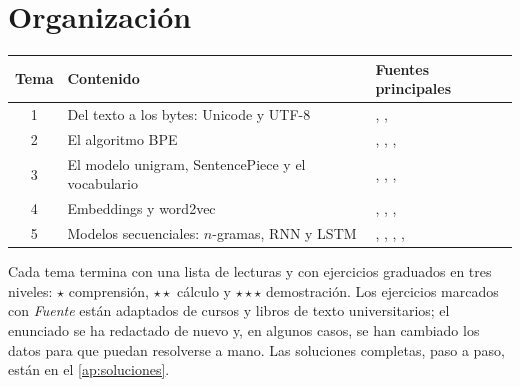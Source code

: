 \documentclass[11pt,a4paper,twoside,openany]{book}
\begin{document}
\section*{Organización}
\begin{center}\small
\begin{tabular}{@{}cll@{}}
\toprule
Tema & Contenido & Fuentes principales \\
\midrule
1 & Del texto a los bytes: Unicode y UTF-8 & \cite{jm3}, \cite{rfc3629}, \cite{cs336} \\
2 & El algoritmo BPE & \cite{sennrich}, \cite{jm3}, \cite{cs336}, \cite{gpt2} \\
3 & El modelo unigram, SentencePiece y el vocabulario & \cite{kudo}, \cite{sentencepiece}, \cite{jm3}, \cite{petrov} \\
4 & Embeddings y word2vec & \cite{jm3}, \cite{cs224n}, \cite{mikolov13b}, \cite{levy} \\
5 & Modelos secuenciales: $n$-gramas, RNN y LSTM & \cite{jm3}, \cite{cs224n}, \cite{bengio94}, \cite{pascanu}, \cite{lstm} \\
\bottomrule
\end{tabular}
\end{center}

Cada tema termina con una lista de lecturas y con ejercicios graduados en tres niveles: $\star$ comprensión, $\star\star$ cálculo y $\star\star\star$ demostración. Los ejercicios marcados con \emph{Fuente} están adaptados de cursos y libros de texto universitarios; el enunciado se ha redactado de nuevo y, en algunos casos, se han cambiado los datos para que puedan resolverse a mano. Las soluciones completas, paso a paso, están en el \cref{ap:soluciones}.
\end{document}

